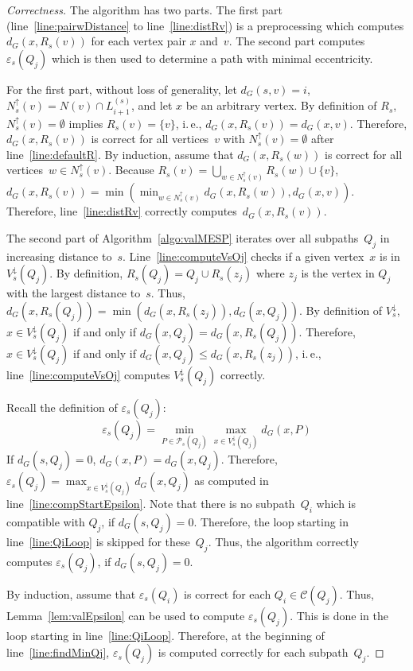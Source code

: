 \documentclass[10pt]{llncs}
\makeatletter
\newcommand{\calC}{\mathcal{C}}
\newcommand{\calP}{\mathcal{P}}
\newcommand{\ie}{i.\,e.\@ifnextchar{,}{}{~}}
\makeatother
\begin{document}
\begin{proof}
    [Correctness]
The algorithm has two parts.
The first part (line~\ref{line:pairwDistance} to line~\ref{line:distRv}) is a preprocessing which computes $d_G(x, R_s(v))$ for each vertex pair $x$ and~$v$.
The second part computes $\varepsilon_s(Q_j)$ which is then used to determine a path with minimal eccentricity.

For the first part, without loss of generality, let $d_G(s, v) = i$, $N^\uparrow_s(v) = N(v) \cap L_{i+1}^{(s)}$, and let $x$ be an arbitrary vertex.
By definition of $R_s$, $N^\uparrow_s(v) = \emptyset$ implies $R_s(v) = \{ v \}$, \ie, $d_G(x, R_s(v)) = d_G(x, v)$.
Therefore, $d_G(x, R_s(v))$ is correct for all vertices~$v$ with $N^\uparrow_s(v) = \emptyset$ after line~\ref{line:defaultR}.
By induction, assume that $d_G(x, R_s(w))$ is correct for all vertices~$w \in N^\uparrow_s(v)$.
Because $R_s(v) = \bigcup_{w \in N^\uparrow_s(v)} R_s(w) \cup \{ v \}$, $d_G(x, R_s(v)) = \min(\min_{w \in N^\uparrow_s(v)} d_G(x, R_s(w)), d_G(x, v))$.
Therefore, line~\ref{line:distRv} correctly computes~$d_G(x, R_s(v))$.

The second part of Algorithm~\ref{algo:valMESP} iterates over all subpaths~$Q_j$ in increasing distance to~$s$.
Line~\ref{line:computeVsOj} checks if a given vertex~$x$ is in $V^\downarrow_s(Q_j)$.
By definition, $R_s(Q_j) = Q_j \cup R_s(z_j)$ where $z_j$ is the vertex in $Q_j$ with the largest distance to~$s$.
Thus, $d_G(x, R_s(Q_j)) = \min( d_G(x, R_s(z_j)), d_G(x, Q_j))$.
By definition of $V^\downarrow_s$, $x \in V^\downarrow_s(Q_j)$ if and only if $d_G(x, Q_j) = d_G(x, R_s(Q_j))$.
Therefore, $x \in V^\downarrow_s(Q_j)$ if and only if $d_G(x, Q_j) \leq d_G(x, R_s(z_j))$, \ie, line~\ref{line:computeVsOj} computes $V^\downarrow_s(Q_j)$ correctly.

Recall the definition of $\varepsilon_s(Q_j)$:
\[
    \varepsilon_s(Q_j) = \min_{P \in \calP_s(Q_j)} \max_{x \in V^\downarrow_s(Q_j)} d_G(x, P)
\]
If $d_G(s, Q_j) = 0$, $d_G(x, P) = d_G(x, Q_j)$.
Therefore, $\varepsilon_s(Q_j) = \max_{x \in V^\downarrow_s(Q_j)} d_G(x, Q_j)$ as computed in line~\ref{line:compStartEpsilon}.
Note that there is no subpath~$Q_i$ which is compatible with $Q_j$, if $d_G(s, Q_j) = 0$.
Therefore, the loop starting in line~\ref{line:QiLoop} is skipped for these~$Q_j$.
Thus, the algorithm correctly computes $\varepsilon_s(Q_j)$, if $d_G(s, Q_j) = 0$.

By induction, assume that $\varepsilon_s(Q_i)$ is correct for each $Q_i \in \calC(Q_j)$.
Thus, Lemma~\ref{lem:valEpsilon} can be used to compute $\varepsilon_s(Q_j)$.
This is done in the loop starting in line~\ref{line:QiLoop}.
Therefore, at the beginning of line~\ref{line:findMinQj}, $\varepsilon_s(Q_j)$ is computed correctly for each subpath~$Q_j$.


\end{proof}
\end{document}
